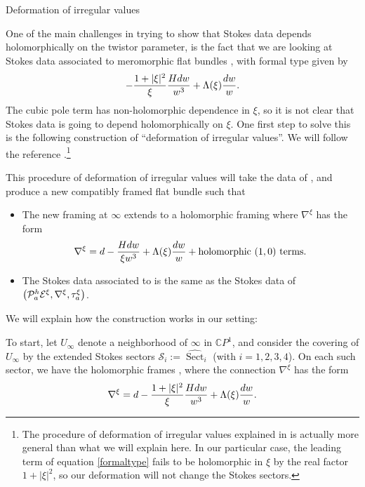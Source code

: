 \documentclass[11pt]{article}
\numberwithin{equation}{section}
\numberwithin{equation}{section}
\newcommand{\CP}{\mathbb{C}P^1}
\begin{document}
\begin{subsubsection}{Deformation of irregular values}\label{defirr}

One of the main challenges in trying to show that Stokes data depends holomorphically on the twistor parameter, is the fact that we are looking at Stokes data associated to meromorphic flat bundles , with formal type given by
\begin{equation}\label{formaltype}
 -\frac{1+|\xi|^2}{\xi}\frac{H{\rm d}w}{ w^3}+\Lambda(\xi)\frac{{\rm d}w}{w}.
\end{equation}
The cubic pole term has non-holomorphic dependence in $\xi$, so it is not clear that Stokes data is going to depend holomorphically on $\xi$. One first step to solve this is the following construction of ``deformation of irregular values''. We will follow the reference \cite[Section 4.5]{M}.\footnote{The procedure of deformation of irregular values explained in \cite{M} is actually more general than what we will explain here. In our particular case, the leading term of equation \eqref{formaltype} fails to be holomorphic in $\xi$ by the real factor $1+|\xi|^2$, so our deformation will not change the Stokes sectors.}

This procedure of deformation of irregular values will take the data of , and produce a new compatibly framed flat bundle  such that
\begin{itemize}\itemsep=0pt
 \item The new framing at $\infty$ extends to a holomorphic framing where $\nabla^{\xi}$ has the form
 \begin{equation*}
 \nabla^{\xi}={\rm d}-\frac{H{\rm d}w}{ \xi w^3}+\Lambda(\xi)\frac{{\rm d}w}{w}+\text{holomorphic $(1,0)$ terms}.
 \end{equation*}
 \item The Stokes data associated to  is the same as the Stokes data of $\smash{\bigl(\mathcal{P}^h_a\mathcal{E}^{\xi},\nabla^{\xi}},\allowbreak\smash{\tau^{\xi}_{a}}\bigr)$.
\end{itemize}
We will explain how the construction works in our setting:

To start, let $U_{\infty}$ denote a neighborhood of $\infty$ in $\CP$, and consider the covering of $U_{\infty}$ by the extended Stokes sectors $\mathcal{S}_i:=\widehat{\operatorname{Sect}}_i$ (with $i=1,2,3,4$). On each such sector, we have the holomorphic frames , where the connection $\nabla^{\xi}$ has the form
\begin{equation}\label{canonical form}
 \nabla^{\xi}={\rm d}-\frac{1+|\xi|^2}{\xi}\frac{H{\rm d}w}{ w^3}+\Lambda(\xi)\frac{{\rm d}w}{w}.
\end{equation}


\end{subsubsection}
\end{document}

